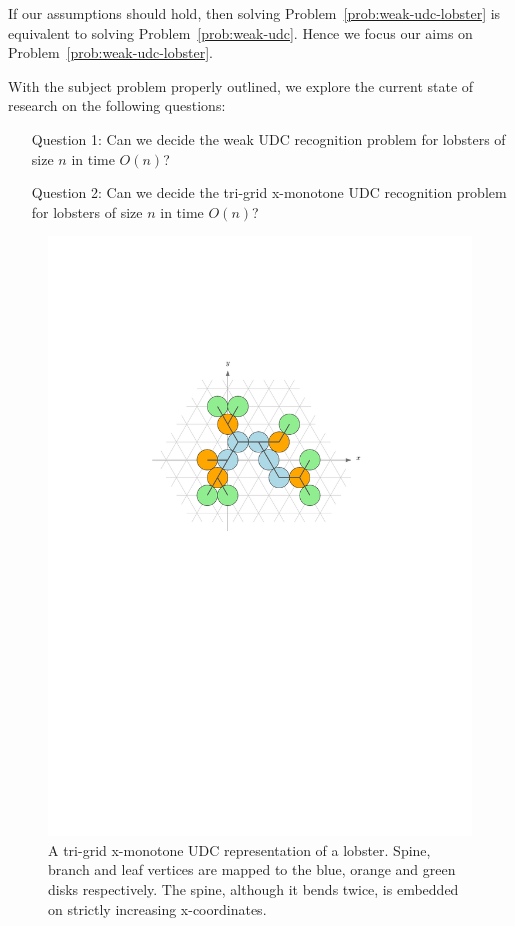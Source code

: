 If our assumptions should hold, then solving Problem~\ref{prob:weak-udc-lobster} is equivalent to solving Problem~\ref{prob:weak-udc}. Hence we focus our aims on Problem~\ref{prob:weak-udc-lobster}.

With the subject problem properly outlined, we explore the current state of research on the following questions:

\begin{enumerate}
    \item[Question 1:] Can we decide the weak UDC recognition problem for lobsters of size $n$ in time $O(n)$?
    \item[Question 2:] Can we decide the tri-grid x-monotone UDC recognition problem for lobsters of size $n$ in time $O(n)$?
\end{enumerate}

\begin{figure}
    \centering
    \includegraphics{graphics/ch2_tri-grid_x-monotone.pdf}
    \caption[Tri-grid x-monotone UDC representation of a lobster]{A tri-grid x-monotone UDC representation of a lobster. Spine, branch and leaf vertices are mapped to the blue, orange and green disks respectively. The spine, although it bends twice, is embedded on strictly increasing x-coordinates.}
    \label{fig:ch2_tri-grid_x-monotone}
\end{figure}
